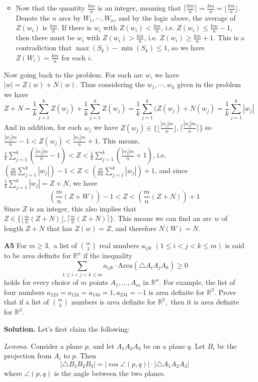 \documentclass[11pt,a4paper]{article}
\newcommand{\<}{\langle}
\renewcommand{\>}{\rangle}
\begin{document}
\begin{enumerate}
\begin{itemize}
		\item Now that the quantity $\frac{km}{n}$ is an integer, meaning that $\lceil \frac{km}{n}\rceil=\frac{km}{n}=\lfloor \frac{km}{n}\rfloor$. Denote the $n$ arcs by $W_1, \cdots , W_n$, and by the logic above, the average of $Z(w_i)$ is $\frac{km}{n}$. 
		If there is $w_i$ with $Z(w_i)<\frac{km}{n}$, i.e. $Z(w_i)\le \frac{km}{n} -1$, then there must be $w_i$ with $Z(w_i)>\frac{km}{n}$, i.e. $Z(w_i)\ge \frac{km}{n}+1$. This is a contradiction that $\max(S_k)-\min(S_k)\le 1$, so we have $Z(W_i)=\frac{km}{n}$ for each $i$. 
	\end{itemize}
	Now going back to the problem. For each arc $w$, we have $|w|=Z(w)+N(w)$. Thus considering the $w_1, \cdots , w_k$ given in the problem we have \[Z+N=\frac1k\sum_{j=1}^kZ(w_j)+\frac1k\sum_{j=1}^kZ(w_j)=\frac1k\sum_{j=1}^k(Z(w_j)+N(w_j)=\frac1k\sum_{j=1}^k|w_j|\]
	And in addition, for each $w_j$ we have $Z(w_j)\in \{\lfloor \frac{|w_j|m}{n}\rfloor, \lceil \frac{|w_j|m}{n}\rceil\}$ so $\frac{|w_j|m}{n}-1<Z(w_j)<\frac{|w_j|m}{n}+1$. This means, 
	$\frac1k\sum_{j=1}^k(\frac{|w_j|m}{n}-1) < Z < \frac1k\sum_{j=1}^k(\frac{|w_j|m}{n}+1)$, i.e. 
	$(\frac{m}{kn}\sum_{j=1}^k |w_j|)-1 < Z < (\frac{m}{kn}\sum_{j=1}^k |w_j|)+1$, and 
	since $\frac 1k\sum_{j=1}^k |w_j|=Z+N$, we have 
	\[(\frac{m}{n}(Z+W))-1 < Z < (\frac{m}{n} (Z+N))+1
	\]
	Since $Z$ is an integer, this also implies that $Z\in \{\lfloor \frac{m}{n}(Z+N)\rfloor , \lceil \frac{m}{n}(Z+N)\rceil\}$. This means we can find an arc $w$ of length $Z+N$ that has $Z(w)=Z$, and therefore $N(W)=N$. 
	
	\item[\textbf{A5}]
	For $m\ge 3,$ a list of $\binom m3$ real numbers $a_{ijk}$ $(1\le i<j<k\le m)$ is said to be area definite for $\mathbb{R}^n$ if the inequality 
	\[\sum_{1\le i<j<k\le m}a_{ijk}\cdot\text{Area}(\triangle A_iA_jA_k)\ge0\]
	holds for every choice of $m$ points $A_1,\dots,A_m$ in $\mathbb{R}^n.$ 
	For example, the list of four numbers $a_{123}=a_{124}=a_{134}=1, a_{234}=-1$ is area definite for $\mathbb{R}^2.$ 
	Prove that if a list of $\binom m3$ numbers is area definite for $\mathbb{R}^2,$ then it is area definite for $\mathbb{R}^3.$
	
	\textbf{Solution.} 
	Let's first claim the following: 
	
	\emph{Lemma.} Consider a plane $p$, and let $A_1A_2A_3$ be on a plane $q$. 
	Let $B_i$ be the projection from $A_i$ to $p$. 
	Then 
	\[
	|\triangle B_1B_2B_3|
	=|\cos\angle(p, q)|\cdot |\triangle A_1A_2A_3|
	\]
	where $\angle(p, q)$ is the angle between the two planes. 
	

\end{enumerate}
\end{document}
